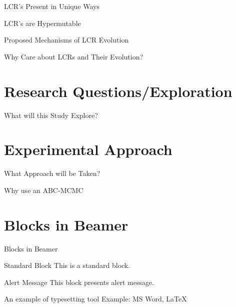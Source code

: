 \documentclass{beamer}
\begin{document}
	\begin{frame}{LCR's Present in Unique Ways }
	
	
	\end{frame}

	\begin{frame}{LCR's are Hypermutable }
	
	
	\end{frame}

	\begin{frame}{Proposed Mechanisms of LCR Evolution }
	
	
	\end{frame}

	\begin{frame}{Why Care about LCRs and Their Evolution? }
	
	
	\end{frame}

	\section{Research Questions/Exploration}
	\begin{frame}{What will this Study Explore?}
		
		
	\end{frame}

	\section{Experimental Approach}
	\begin{frame}{What Approach will be Taken?}
	
	
	\end{frame}

	\begin{frame}{Why use an ABC-MCMC}
	
	
	\end{frame}
	
		
	\section{Blocks in Beamer}
	\begin{frame}{Blocks in Beamer}
		\begin{block}{Standard Block}
			This is a standard block.
		\end{block}
		\begin{alertblock}{Alert Message}
			This block presents alert message.
		\end{alertblock}
		\begin{exampleblock}{An example of typesetting tool}
			Example: MS Word, \LaTeX{}
		\end{exampleblock}
	\end{frame} 
	
\end{document}
